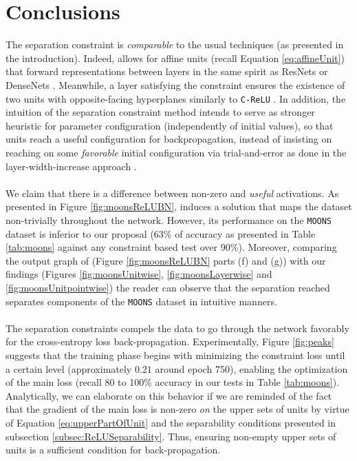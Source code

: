 \section{Conclusions}\label{sec:conclusions}


The separation constraint is \emph{comparable} to the usual techniques (as presented in the introduction). Indeed, \SepLayer allows for affine units (recall Equation \ref{eq:affineUnit}) that forward representations between layers in the same spirit as ResNets \cite{resnet} or DenseNets \cite{densenet}. Meanwhile, a layer satisfying the \SepPoint constraint ensures the existence of two units with opposite-facing hyperplanes similarly to \texttt{C-ReLU} \cite{crelu}. In addition, the intuition of the separation constraint method intends to serve as stronger heuristic for parameter configuration (independently of initial values), so that units reach a useful configuration for backpropagation, instead of insisting on reaching on some \emph{favorable} initial configuration via trial-and-error as done in the layer-width-increase approach \cite{wideresnet,inceptionv1}.   
\\\\
We claim that there is a difference between non-zero and \emph{useful} activations. As presented in Figure \ref{fig:moonsReLUBN}, \ReLUBN induces a solution that maps the dataset non-trivially throughout the network. However, its performance on the \texttt{MOONS} dataset is inferior to our proposal (63\% of accuracy as presented in Table \ref{tab:moons} against any constraint based test over 90\%). Moreover, comparing the output graph of \ReLUBN (Figure \ref{fig:moonsReLUBN} parts (f) and (g)) with our findings (Figures \ref{fig:moonsUnitwise}, \ref{fig:moonsLayerwise} and \ref{fig:moonsUnitpointwise}) the reader can observe that the separation reached separates components of the \texttt{MOONS} dataset in intuitive manners.  
\\\\
The separation constraints compels the data to go through the network favorably for the cross-entropy loss back-propagation. Experimentally, Figure \ref{fig:peaks} suggests that the training phase begins with minimizing the constraint loss until a certain level (approximately $0.21$ around epoch 750), enabling the optimization of the main loss (recall 80 to 100\% accuracy in our tests in Table \ref{tab:moons}). Analytically, we can elaborate on this behavior if we are reminded of the fact that the gradient of the main loss is non-zero \emph{on} the upper sets of units by virtue of Equation \ref{eq:upperPartOfUnit} and the separability conditions presented in subsection \ref{subsec:ReLUSeparability}. Thus, ensuring non-empty upper sets of units is a sufficient condition for back-propagation. 

